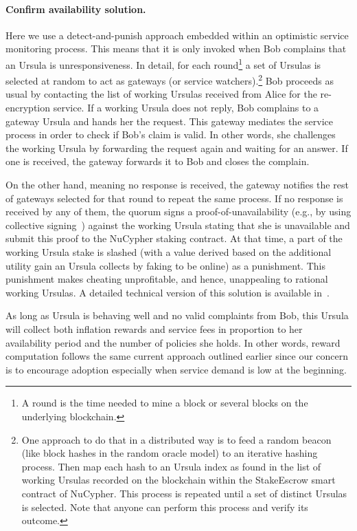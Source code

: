\documentclass{llncs}
\begin{document}
\paragraph{Confirm availability solution.} Here we use a detect-and-punish approach embedded within an optimistic service monitoring process. This means that it is only invoked when Bob complains that an Ursula is unresponsiveness. In detail, for each round\footnote{A round is the time needed to mine a block or several blocks on the underlying blockchain.} a set of Ursulas is selected at random to act as gateways (or service watchers).\footnote{One approach to do that in a distributed way is to feed a random beacon (like block hashes in the random oracle model) to an iterative hashing process. Then map each hash to an Ursula index as found in the list of working Ursulas recorded on the blockchain within the StakeEscrow smart contract of NuCypher. This process is repeated until a set of distinct Ursulas is selected. Note that anyone can perform this process and verify its outcome.} Bob proceeds as usual by contacting the list of working Ursulas received from Alice for the re-encryption service. If a working Ursula does not reply, Bob complains to a gateway Ursula and hands her the request. This gateway mediates the service process in order to check if Bob's claim is valid. In other words, she challenges the working Ursula by forwarding the request again and waiting for an answer. If one is received, the gateway forwards it to Bob and closes the complain.  


On the other hand, meaning no response is received, the gateway notifies the rest of gateways selected for that round to repeat the same process. If no response is received by any of them, the quorum signs a proof-of-unavailability (e.g., by using collective signing~\cite{syta2016keeping}) against the working Ursula stating that she is unavailable and submit this proof to the NuCypher staking contract. At that time, a part of the working Ursula stake is slashed (with a value derived based on the additional utility gain an Ursula collects by faking to be online) as a punishment. This punishment makes cheating unprofitable, and hence, unappealing to rational working Ursulas. A detailed technical version of this solution is available in~\cite{confirm-activity-draft}.


As long as Ursula is behaving well and no valid complaints from Bob, this Ursula will collect both inflation rewards and service fees in proportion to her availability period and the number of policies she holds. In other words, reward computation follows the same current approach outlined earlier since our concern is to encourage adoption especially when service demand is low at the beginning.
\end{document}
